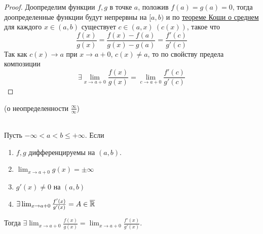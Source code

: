 \begin{proof}
    Доопределим функции $f, g$ в точке $a$, положив $f(a) = g(a) = 0$,
    тогда доопределенные функции будут непрервны на $[a, b)$ и по \hyperlink{koshi_o_srednem}{теореме Коши о среднем}
    для каждого $x \in (a, b)$ существует $c \in (a, x) \ (c(x))$, такое что \[\frac{f(x)}{g(x)} = \frac{f(x)-f(a)}{g(x)-g(a)} = \frac{f'(c)}{g'(c)}\]
    Так как $c(x) \to a$ при $x \to a+0$, $c(x) \neq a$, то по свойству предела композиции \[\exists \lim_{x \to a+0} \frac{f(x)}{g(x)} = \lim_{c \to a+0} \frac{f'(c)}{g'(c)}\]
\end{proof}
\begin{theorem}\hypertarget{inf_on_inf_th}{(о неопределенности $\frac{\infty}{\infty}$)}\\
    Пусть $-\infty < a < b \leq +\infty$. Если
    \begin{enumerate}
        \item $f, g$ дифференцируемы на $(a, b)$.
        \item $\lim_{x \to a+0} g(x) = \pm \infty$
        \item $g'(x) \neq 0$ на $(a, b)$
        \item $\exists \lim_{x \to a+0} \frac{f'(x)}{g'(x)} = A \in \overline{\mathbb{R}}$
    \end{enumerate}
    Тогда $\exists \lim_{x \to a+0} \frac{f(x)}{g(x)} = \lim_{x \to a+0} \frac{f'(x)}{g'(x)}$.
\end{theorem}


